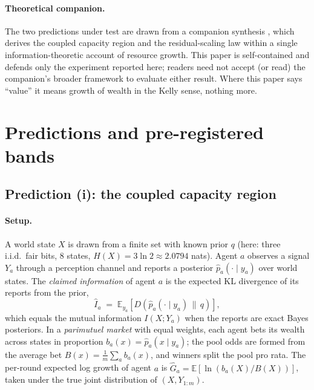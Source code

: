 \documentclass{article} %
\newcommand{\Ihat}{\hat{I}}
\newcommand{\Ghat}{\hat{G}}
\newcommand{\E}{\mathbb{E}}
\newcommand{\KL}[2]{D\!\left(#1\,\|\,#2\right)}
\begin{document}
\paragraph{Theoretical companion.} The two predictions under test are drawn from a companion synthesis \citep{qian2026}, which derives the coupled capacity region and the residual-scaling law within a single information-theoretic account of resource growth. This paper is self-contained and defends only the experiment reported here; readers need not accept (or read) the companion's broader framework to evaluate either result. Where this paper says ``value'' it means growth of wealth in the Kelly sense, nothing more.
\fi

\section{Predictions and pre-registered bands}
\label{sec:predictions}

\subsection{Prediction (i): the coupled capacity region}
\label{sec:pred-i}

\paragraph{Setup.} A world state $X$ is drawn from a finite set with known prior $q$ (here: three i.i.d.\ fair bits, $8$ states, $H(X) = 3\ln 2 \approx 2.0794$ nats). Agent $a$ observes a signal $Y_a$ through a perception channel and reports a posterior $\hat{p}_a(\cdot \mid y_a)$ over world states. The \emph{claimed information} of agent $a$ is the expected KL divergence of its reports from the prior,
\begin{equation}
\Ihat_a \;=\; \E_{y_a}\!\left[ \KL{\hat{p}_a(\cdot \mid y_a)}{q} \right],
\end{equation}
which equals the mutual information $I(X;Y_a)$ when the reports are exact Bayes posteriors. In a \emph{parimutuel market} with equal weights, each agent bets its wealth across states in proportion $b_a(x) = \hat p_a(x \mid y_a)$; the pool odds are formed from the average bet $B(x) = \tfrac1m \sum_a b_a(x)$, and winners split the pool pro rata. The per-round expected log growth of agent $a$ is $\Ghat_a = \E\left[\ln (b_a(X)/B(X))\right]$, taken under the true joint distribution of $(X, Y_{1:m})$.
\end{document}
